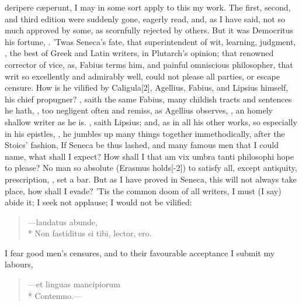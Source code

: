 {{deripere c\ae{}perunt}, I may in some sort apply to this my work. The
first, second, and third edition were suddenly gone, eagerly read, and,
as I have said, not so much approved by some, as scornfully rejected by
others. But it was Democritus his fortune, . 'Twas Seneca's fate, that superintendent of
wit, learning, judgment, , the best of Greek and
Latin writers, in Plutarch's opinion; that renowned corrector of vice,
as, Fabius terms him, and painful omniscious philosopher, that
writ so excellently and admirably well, could not please all parties,
or escape censure. How is he vilified by Caligula[2\baselineskip], Agellius,
Fabius, and Lipsius himself, his chief propugner? , saith the same Fabius, many childish tracts and sentences
he hath, , too negligent often and remiss, as Agellius
observes, , an homely shallow writer as he is. , saith Lipsius; and, as in all his other works,
so especially in his epistles, , he jumbles up many things together immethodically, after the
Stoics' fashion,  If Seneca be
thus lashed, and many famous men that I could name, what shall I
expect? How shall I that am vix umbra tanti philosophi hope to please?
No man so absolute (Erasmus holds[-2\baselineskip]) to satisfy all, except
antiquity, prescription, \etc, set a bar. But as I have proved in
Seneca, this will not always take place, how shall I evade? 'Tis the
common doom of all writers, I must (I say) abide it; I seek not
applause;  I would not be vilified:

\begin{verse}
\textlatin{---laudatus abunde},\\*
\textlatin{Non fastiditus si tibi, lector, ero.}
\end{verse}

I fear good men's censures, and to their favourable acceptance I submit
my labours,

\begin{verse}
\textlatin{---et linguas mancipiorum}\\*
\textlatin{Contemno.}---
\end{verse}

}

